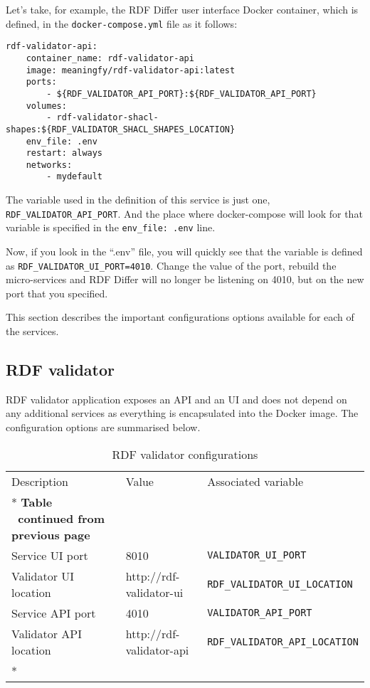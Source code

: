 Let’s take, for example, the RDF Differ user interface Docker container, which is defined, in the \texttt{docker-compose.yml} file as it follows:
\begin{lstlisting}[]
rdf-validator-api:
	container_name: rdf-validator-api
	image: meaningfy/rdf-validator-api:latest
	ports:
		- ${RDF_VALIDATOR_API_PORT}:${RDF_VALIDATOR_API_PORT}
	volumes:
		- rdf-validator-shacl-shapes:${RDF_VALIDATOR_SHACL_SHAPES_LOCATION}
	env_file: .env
	restart: always
	networks:
		- mydefault
\end{lstlisting}
The variable used in the definition of this service is just one, \texttt{RDF\_VALIDATOR\_API\_PORT}. And the place where docker-compose will look for that variable is specified in the \texttt{env\_file: .env} line.

Now, if you look in the “.env” file, you will quickly see that the variable is defined as \texttt{RDF\_VALIDATOR\_UI\_PORT=4010}. Change the value of the port, rebuild the micro-services and RDF Differ will no longer be listening on 4010, but on the new port that you specified.


This section describes the important configurations options available for each of the services.


\subsection{RDF validator}

RDF validator application exposes an API and an UI and does not depend on any additional services as everything is encapsulated into the Docker image. The configuration options are summarised below.

\begin{longtable}[c]{@{}p{4cm}p{5cm}l@{}}
	\toprule
	Description           & Value                   & Associated variable                   \\* \midrule
	\endfirsthead
	\multicolumn{3}{c}%
	{{\bfseries Table \thetable\ continued from previous page}}                             \\
	\endhead
	\bottomrule
	\endfoot
	\endlastfoot
	Service UI port       & 8010                    & \texttt{VALIDATOR\_UI\_PORT}          \\
	Validator UI location & http://rdf-validator-ui & \texttt{RDF\_VALIDATOR\_UI\_LOCATION} \\
	Service API port      & 4010                    & \texttt{VALIDATOR\_API\_PORT}         \\
	Validator API location & http://rdf-validator-api & \texttt{RDF\_VALIDATOR\_API\_LOCATION} \\* \bottomrule
	\caption{RDF validator configurations}
	\label{tab:my-table3}                                                                   \\
\end{longtable}

